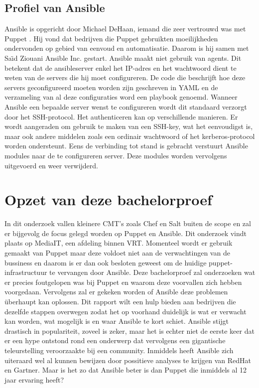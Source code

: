 \subsection{Profiel van Ansible}
Ansible is opgericht door Michael DeHaan, iemand die zeer vertrouwd was met Puppet \autocite{ansiblefordevops}. Hij vond dat bedrijven die Puppet gebruikten moeilijkheden ondervonden op gebied van eenvoud en automatisatie. Daarom is hij samen met Sa{\"\i}d Ziouani Ansible Inc. gestart. 
Ansible maakt niet gebruik van agents. Dit betekent dat de ansibleserver enkel het IP-adres en het wachtwoord dient te weten van de servers die hij moet configureren. De code die beschrijft hoe deze servers geconfigureerd moeten worden zijn geschreven in YAML en de verzameling van al deze configuraties word een playbook genoemd. Wanneer Ansible een bepaalde server wenst te configureren wordt dit standaard verzorgt door het SSH-protocol. Het authenticeren kan op verschillende manieren. Er wordt aangeraden om gebruik te maken van een SSH-key, wat het eenvoudigst is, maar ook andere middelen zoals een ordinair wachtwoord of het kerberos-protocol worden ondersteunt. Eens de verbinding tot stand is gebracht verstuurt Ansible modules naar de te configureren server. Deze modules worden vervolgens uitgevoerd en weer verwijderd. \autocite{ansibledoc}







\section{Opzet van deze bachelorproef}
\label{sec:opzet-bachelorproef}

In dit onderzoek vallen kleinere CMT's zoals Chef en Salt buiten de scope en zal er bijgevolg de focus gelegd worden op Puppet en Ansible. Dit onderzoek vindt plaats op MediaIT, een afdeling binnen VRT. Momenteel wordt er gebruik gemaakt van Puppet maar deze voldoet niet aan de verwachtingen van de bussiness en daarom is er dan ook besloten geweest om de huidige puppet-infrastructuur te vervangen door Ansible.
Deze bachelorproef zal onderzoeken wat er precies foutgelopen was bij Puppet en waarom deze voorvallen zich hebben voorgedaan. Vervolgens zal er gekeken worden of Ansible deze problemen \"uberhaupt kan oplossen. Dit rapport wilt een hulp bieden aan bedrijven die dezelfde stappen overwegen zodat het op voorhand duidelijk is wat er verwacht kan worden, wat mogelijk is en waar Ansible te kort schiet. Ansible stijgt drastisch in populariteit, zoveel is zeker, maar het is echter niet de eerste keer dat er een hype ontstond rond een onderwerp dat vervolgens een gigantische teleurstelling veroorzaakte bij een community. Inmiddels heeft Ansible zich uiteraard wel al kunnen bewijzen door possitieve analyses te krijgen van RedHat en Gartner. Maar is het zo dat Ansible beter is dan Puppet die inmiddels al 12 jaar ervaring heeft?




